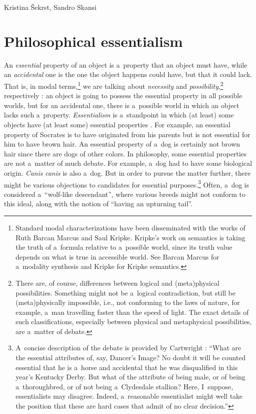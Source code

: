 \begin{artengenv2auth}{Kristina Šekrst, Sandro Skansi}
\section*{Philosophical essentialism}
An \textit{essential} property of an object is a~property that an object must have, while an \textit{accidental} one is the one the object happens could have, but that it could lack. That is, in modal terms,\footnote{Standard modal characterizations have been disseminated with the works of Ruth Barcan Marcus and Saul Kripke. Kripke's work on semantics is taking the truth of a~formula relative to a~possible world, since its truth value depends on what is true in accessible world. See Barcan Marcus
\parencite*[][]{marcus_modalities_1993} %
 for a~modality synthesis and Kripke 
\parencite*[][]{kripke_naming_1972} %
 for Kripke semantics.} we are talking about \textit{necessity} and \textit{possibility},\footnote{There are, of course, differences between logical and (meta)physical possibilities. Something might not be a~logical contradiction, but still be (meta)physically impossible, i.e., not conforming to the laws of nature, for example, a~man travelling faster than the speed of light. The exact details of such classifications, especially between physical and metaphysical possibilities, are a~matter of debate.} respectively 
\parencite[][]{robertson_ishii_essential_2020}: %
 an object is going to possess the essential property in all possible worlds, but for an accidental one, there is a~possible world in which an object lacks such a~property. \textit{Essentialism} is a~standpoint in which (at least) some objects have (at least some) essential properties 
\parencite[][]{robertson_ishii_essential_2020}. %
 For example, an essential property of Socrates is to have originated from his parents but is not essential for him to have brown hair. An essential property of a~dog is certainly not brown hair since there are dogs of other colors. In philosophy, some essential properties are not a~matter of much debate. For example, a~dog had to have some biological origin. \textit{Canis canis} is also a~dog. But in order to pursue the matter further, there might be various objections to candidates for essential purposes.\footnote{A~concise description of the debate is provided by Cartwright 
\parencite*[][p.615]{cartwright_remarks_1968}: %
 ``What are the essential attributes of, say, Dancer's Image? No doubt it will be counted essential that he is a~horse and accidental that he was disqualified in this year's Kentucky Derby. But what of the attribute of being male, or of being a~thoroughbred, or of not being a~Clydesdale stallion? Here, I~suppose, essentialists may disagree. Indeed, a~reasonable essentialist might well take the position that these are hard cases that admit of no clear decision.''} Often, a~dog is considered a~``wolf-like descendant'', where various breeds might not conform to this ideal, along with the notion of ``having an upturning tail''.


\end{artengenv2auth}

